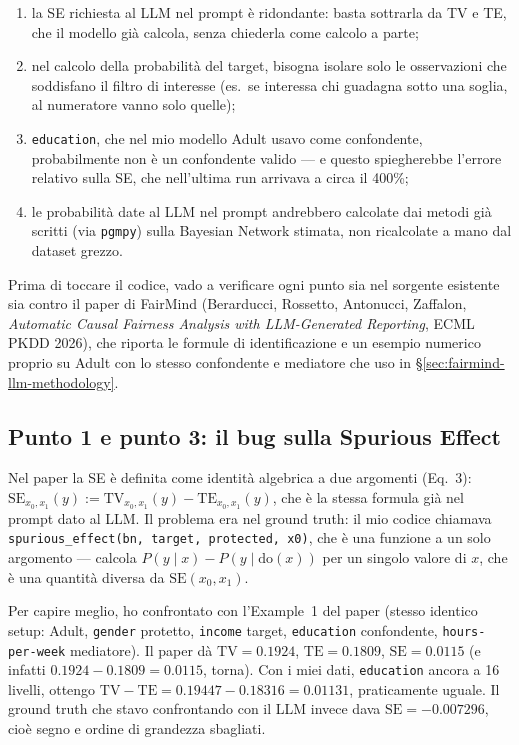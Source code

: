 \begin{enumerate}
  \item la SE richiesta al LLM nel prompt è ridondante: basta sottrarla da TV e TE, che il modello già calcola, senza chiederla come calcolo a parte;
  \item nel calcolo della probabilità del target, bisogna isolare solo le osservazioni che soddisfano il filtro di interesse (es.\ se interessa chi guadagna sotto una soglia, al numeratore vanno solo quelle);
  \item \texttt{education}, che nel mio modello Adult usavo come confondente, probabilmente non è un confondente valido --- e questo spiegherebbe l'errore relativo sulla SE, che nell'ultima run arrivava a circa il 400\%;
  \item le probabilità date al LLM nel prompt andrebbero calcolate dai metodi già scritti (via \texttt{pgmpy}) sulla Bayesian Network stimata, non ricalcolate a mano dal dataset grezzo.
\end{enumerate}

Prima di toccare il codice, vado a verificare ogni punto sia nel sorgente esistente sia contro il paper di FairMind (Berarducci, Rossetto, Antonucci, Zaffalon, \emph{Automatic Causal Fairness Analysis with LLM-Generated Reporting}, ECML PKDD 2026), che riporta le formule di identificazione e un esempio numerico proprio su Adult con lo stesso confondente e mediatore che uso in \S\ref{sec:fairmind-llm-methodology}.

\subsection*{Punto 1 e punto 3: il bug sulla Spurious Effect}

Nel paper la SE è definita come identità algebrica a due argomenti (Eq.~3): $\mathrm{SE}_{x_0,x_1}(y) := \mathrm{TV}_{x_0,x_1}(y) - \mathrm{TE}_{x_0,x_1}(y)$, che è la stessa formula già nel prompt dato al LLM. Il problema era nel ground truth: il mio codice chiamava \texttt{spurious\_effect(bn, target, protected, x0)}, che è una funzione a un solo argomento --- calcola $P(y \mid x) - P(y \mid \mathrm{do}(x))$ per un singolo valore di $x$, che è una quantità diversa da $\mathrm{SE}(x_0,x_1)$.

Per capire meglio, ho confrontato con l'Example~1 del paper (stesso identico setup: Adult, \texttt{gender} protetto, \texttt{income} target, \texttt{education} confondente, \texttt{hours-per-week} mediatore). Il paper dà $\mathrm{TV}=0.1924$, $\mathrm{TE}=0.1809$, $\mathrm{SE}=0.0115$ (e infatti $0.1924-0.1809=0.0115$, torna). Con i miei dati, \texttt{education} ancora a 16 livelli, ottengo $\mathrm{TV}-\mathrm{TE} = 0.19447 - 0.18316 = 0.01131$, praticamente uguale. Il ground truth che stavo confrontando con il LLM invece dava $\mathrm{SE}=-0.007296$, cioè segno e ordine di grandezza sbagliati.

